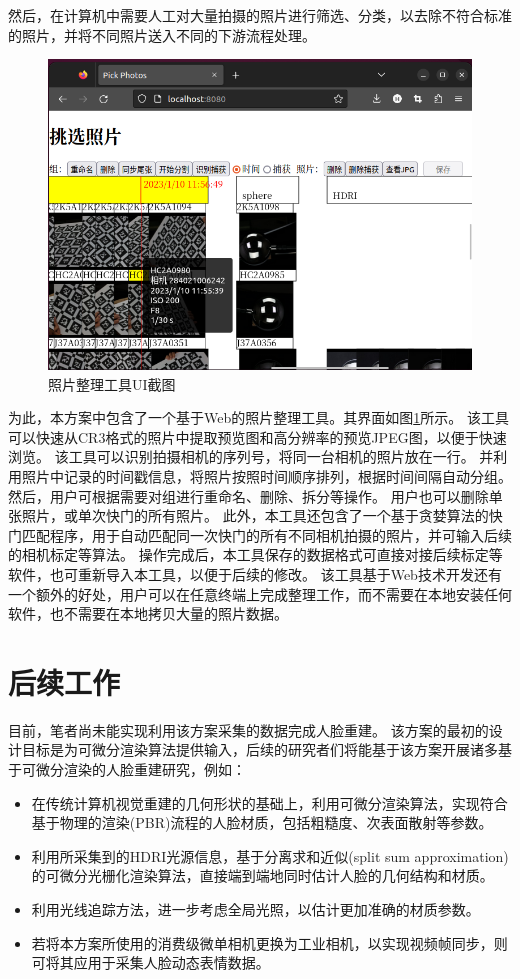 然后，在计算机中需要人工对大量拍摄的照片进行筛选、分类，以去除不符合标准的照片，并将不同照片送入不同的下游流程处理。
\begin{figure}
\centering
\includegraphics[width=\textwidth,trim={2pt 0 0 5pt},clip]{figures/pick_photo}
\caption{照片整理工具UI截图}
\label{fig:pick_photo}
\end{figure}
为此，本方案中包含了一个基于Web的照片整理工具。其界面如图\ref{fig:pick_photo}所示。
该工具可以快速从CR3格式的照片中提取预览图和高分辨率的预览JPEG图，以便于快速浏览。
该工具可以识别拍摄相机的序列号，将同一台相机的照片放在一行。
并利用照片中记录的时间戳信息，将照片按照时间顺序排列，根据时间间隔自动分组。
然后，用户可根据需要对组进行重命名、删除、拆分等操作。
用户也可以删除单张照片，或单次快门的所有照片。
此外，本工具还包含了一个基于贪婪算法的快门匹配程序，用于自动匹配同一次快门的所有不同相机拍摄的照片，并可输入后续的相机标定等算法。
操作完成后，本工具保存的数据格式可直接对接后续标定等软件，也可重新导入本工具，以便于后续的修改。
该工具基于Web技术开发还有一个额外的好处，用户可以在任意终端上完成整理工作，而不需要在本地安装任何软件，也不需要在本地拷贝大量的照片数据。

\section{后续工作}

目前，笔者尚未能实现利用该方案采集的数据完成人脸重建。
该方案的最初的设计目标是为可微分渲染算法提供输入，后续的研究者们将能基于该方案开展诸多基于可微分渲染的人脸重建研究，例如：
\begin{itemize}
\item 在传统计算机视觉重建的几何形状的基础上，利用可微分渲染算法，实现符合基于物理的渲染(PBR)流程的人脸材质，包括粗糙度、次表面散射等参数。
\item 利用所采集到的HDRI光源信息，基于分离求和近似(split sum approximation)的可微分光栅化渲染算法，直接端到端地同时估计人脸的几何结构和材质。
\item 利用光线追踪方法，进一步考虑全局光照，以估计更加准确的材质参数。
\item 若将本方案所使用的消费级微单相机更换为工业相机，以实现视频帧同步，则可将其应用于采集人脸动态表情数据。
\end{itemize}

